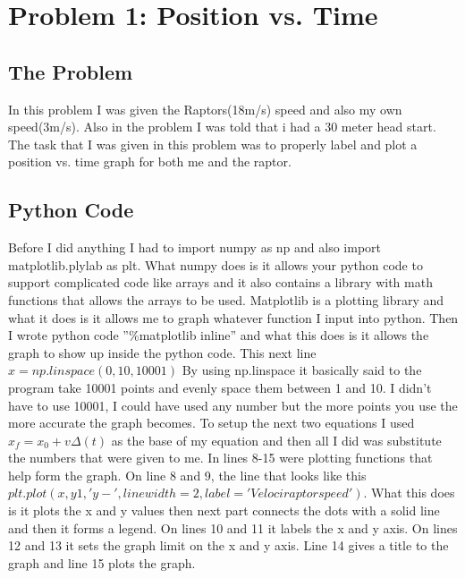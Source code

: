\documentclass[twocolumn]{revtex4}
\begin{document}
\section{Problem 1: Position vs. Time}

\subsection{The Problem}
In this problem I was given the Raptors(18m/s) speed and also my own speed(3m/s). Also in the problem I was told that i had a 30 meter head start. The task that I was given in this problem was to properly label and plot a position vs. time graph for both me and the raptor.

\subsection{Python Code}
Before I did anything I had to import numpy as np and also import matplotlib.plylab as plt. What numpy does is it allows your python code to support complicated code like arrays and it also contains a library with math functions that allows the arrays to be used. Matplotlib is a plotting library and what it does is it allows me to graph whatever function I input into python. Then I wrote python code ''\%matplotlib inline'' and what this does is it allows the graph to show up inside the python code.
This next line 
$ x = np.linspace(0,10,10001)$
By using np.linspace it basically said to the program take 10001 points and evenly space them between 1 and 10. I didn't have to use 10001, I could have used any number but the more points you use the more accurate the graph becomes. To setup the next two equations I used $x_f = x_0 + v\Delta(t)$ as the base of my equation and then all I did was substitute the numbers that were given to me. In lines 8-15 were plotting functions that help form the graph. On line 8 and 9, the line that looks like this $plt.plot(x,y1,'y-',linewidth=2,label='Velociraptor speed')$. What this does is it plots the x and y values then next part connects the dots with a solid line and then it forms a legend. On lines 10 and 11 it labels the x and y axis. On lines 12 and 13 it sets the graph limit on the x and y axis. Line 14 gives a title to the graph and line 15 plots the graph. 
\end{document}
